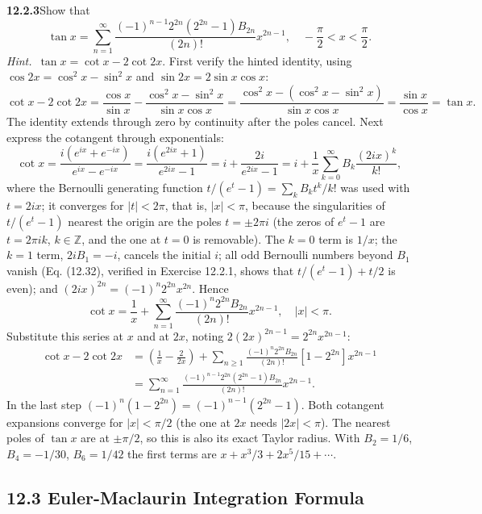 \par\bigskip
\noindent\textbf{12.2.3}\quad Show that
\[
\tan x=\sum_{n=1}^{\infty}
\frac{(-1)^{n-1}2^{2n}(2^{2n}-1)B_{2n}}{(2n)!}x^{2n-1},
\quad-\frac{\pi}{2}<x<\frac{\pi}{2}.
\]
\emph{Hint.}~$\tan x=\cot x-2\cot2x$.
\solution
First verify the hinted identity, using $\cos2x=\cos^2x-\sin^2x$ and
$\sin2x=2\sin x\cos x$:
\[
\cot x-2\cot2x
=\frac{\cos x}{\sin x}
 -\frac{\cos^2x-\sin^2x}{\sin x\cos x}
=\frac{\cos^2x-(\cos^2x-\sin^2x)}{\sin x\cos x}
=\frac{\sin x}{\cos x}=\tan x.
\]
The identity extends through zero by continuity after the poles cancel.
Next express the cotangent through exponentials:
\[
\cot x=\frac{i(e^{ix}+e^{-ix})}{e^{ix}-e^{-ix}}
=\frac{i(e^{2ix}+1)}{e^{2ix}-1}
=i+\frac{2i}{e^{2ix}-1}
=i+\frac1x\sum_{k=0}^{\infty}B_k\frac{(2ix)^k}{k!},
\]
where the Bernoulli generating function $t/(e^t-1)=\sum_kB_kt^k/k!$ was
used with $t=2ix$; it converges for $|t|<2\pi$, that is, $|x|<\pi$,
because the singularities of $t/(e^t-1)$ nearest the origin are the poles
$t=\pm2\pi i$ (the zeros of $e^t-1$ are $t=2\pi ik$, $k\in\mathbb Z$, and
the one at $t=0$ is removable).
The $k=0$ term is $1/x$; the $k=1$ term, $2iB_1=-i$, cancels the initial
$i$; all odd Bernoulli numbers beyond $B_1$ vanish (Eq. (12.32), verified
in Exercise 12.2.1, shows that $t/(e^t-1)+t/2$ is even); and
$(2ix)^{2n}=(-1)^n2^{2n}x^{2n}$. Hence
\[
\cot x=\frac1x+\sum_{n=1}^{\infty}
 \frac{(-1)^n2^{2n}B_{2n}}{(2n)!}x^{2n-1},\quad |x|<\pi.
\]
Substitute this series at $x$ and at $2x$, noting
$2(2x)^{2n-1}=2^{2n}x^{2n-1}$:
\begin{align*}
\cot x-2\cot2x
&=\left(\frac1x-\frac2{2x}\right)
+\sum_{n\ge1}\frac{(-1)^n2^{2n}B_{2n}}{(2n)!}
 [1-2^{2n}]x^{2n-1}\\
&=\boxed{\sum_{n=1}^{\infty}
\frac{(-1)^{n-1}2^{2n}(2^{2n}-1)B_{2n}}{(2n)!}x^{2n-1}}.
\end{align*}
In the last step $(-1)^n(1-2^{2n})=(-1)^{n-1}(2^{2n}-1)$.
Both cotangent expansions converge for $|x|<\pi/2$ (the one at $2x$ needs
$|2x|<\pi$). The nearest poles
of $\tan x$ are at $\pm\pi/2$, so this is also its exact Taylor radius.
With $B_2=1/6$, $B_4=-1/30$, $B_6=1/42$ the first terms are
$x+x^3/3+2x^5/15+\cdots$.

\subsection*{12.3 Euler-Maclaurin Integration Formula}

